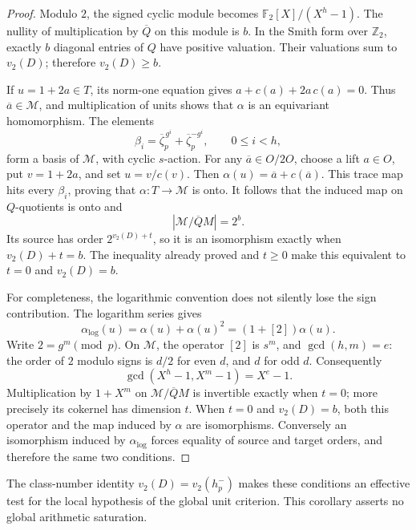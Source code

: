 \begin{proof}
Modulo \(2\), the signed cyclic module becomes
\(\mathbb F_2[X]/(X^h-1)\).  The nullity of multiplication by
\(\overline Q\) on this module is \(b\).
In the Smith form over \(\mathbb Z_2\), exactly \(b\) diagonal entries
of \(Q\) have positive valuation.  Their valuations sum to \(v_2(D)\);
therefore \(v_2(D)\ge b\).

If \(u=1+2a\in T\), its norm-one equation gives
\(a+c(a)+2a\,c(a)=0\).  Thus \(\overline a\in \mathscr M\), and multiplication
of units shows that \(\alpha\) is an equivariant homomorphism.
The elements
\[
 \beta_i=\overline\zeta_p^{\,g^i}
             +\overline\zeta_p^{-g^i},\qquad0\le i<h,
\]
form a basis of \(\mathscr M\), with cyclic \(s\)-action.
For any \(\overline a\in O/2O\), choose a lift \(a\in O\), put
\(v=1+2a\), and set \(u=v/c(v)\).  Then
\(\alpha(u)=\overline a+c(\overline a)\).
This trace map hits every \(\beta_i\), proving that \(\alpha:T\to \mathscr M\)
is onto.
It follows that the induced map on \(Q\)-quotients is onto and
\[
 |\mathscr M/\overline QM|=2^b.
\]
Its source has order \(2^{v_2(D)+t}\), so it is an isomorphism
exactly when \(v_2(D)+t=b\).
The inequality already proved and \(t\ge0\) make this equivalent to
\(t=0\) and \(v_2(D)=b\).

For completeness, the logarithmic convention does not silently lose
the sign contribution.  The logarithm series gives
\[
 \alpha_{\log}(u)=\alpha(u)+\alpha(u)^2=(1+[2])\alpha(u).
\]
Write \(2=g^m\pmod p\).
On \(\mathscr M\), the operator \([2]\) is \(s^m\), and
\(\gcd(h,m)=e\): the order of \(2\) modulo signs is \(d/2\) for even
\(d\), and \(d\) for odd \(d\).
Consequently
\[
 \gcd(X^h-1,X^m-1)=X^e-1.
\]
Multiplication by \(1+X^m\) on \(\mathscr M/\overline QM\) is invertible
exactly when \(t=0\); more precisely its cokernel has dimension \(t\).
When \(t=0\) and \(v_2(D)=b\), both this operator and the map induced
by \(\alpha\) are isomorphisms.  Conversely an isomorphism induced by
\(\alpha_{\log}\) forces equality of source and target orders, and therefore
the same two conditions.
\end{proof}

The class-number identity
\(v_2(D)=v_2(h_p^-)\) makes these conditions an effective test for the
local hypothesis of the global unit criterion.  This corollary
asserts no global arithmetic saturation.

